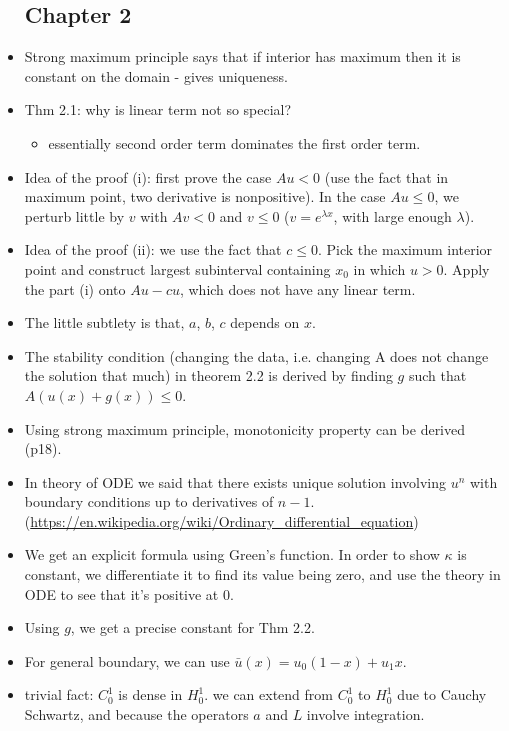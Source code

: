\documentclass{article}
\theoremstyle{remark}
\begin{document}
\begin{itemize}
\subsection*{Chapter 2}
\item Strong maximum principle says that if interior has maximum then it is constant on the domain - gives uniqueness.
\item Thm 2.1: why is linear term not so special?
\begin{itemize}
    \item essentially second order term dominates the first order term. 
\end{itemize}
    \item Idea of the proof (i): first prove the case $Au<0$ (use the fact that in maximum point, two derivative is nonpositive). In the case $Au\leq 0$, we perturb little by $v$ with $Av<0$ and $v\leq 0$ ($v=e^{\lambda x}$, with large enough $\lambda$). 
    \item Idea of the proof (ii): we use the fact that $c\leq 0$. Pick the maximum interior point and construct largest subinterval containing $x_0$ in which $u>0$. Apply the part (i) onto $Au-cu$, which does not have any linear term.
    \item The little subtlety is that, $a$, $b$, $c$ depends on $x$.
    \item The stability condition (changing the data, i.e. changing A does not change the solution that much) in theorem 2.2 is derived by finding $g$ such that $A(u(x)+g(x))\leq 0$.
    \item Using strong maximum principle, monotonicity property can be derived (p18).
    \item In theory of ODE we said that there exists unique solution involving $u^{n}$ with boundary conditions up to derivatives of $n-1$. (\url{https://en.wikipedia.org/wiki/Ordinary_differential_equation})
    \item We get an explicit formula using Green's function. In order to show $\kappa$ is constant, we differentiate it to find its value being zero, and use the theory in ODE to see that it's positive at $0$.
    \item Using $g$, we get a precise constant for Thm 2.2.
    \item For general boundary, we can use $\bar u(x)=u_0 (1-x)+u_1 x$.
    \item trivial fact: $C_0^1$ is dense in $H_0^1$. we can extend from $C_0^1$ to $H_0^1$ due to Cauchy Schwartz, and because the operators $a$ and $L$ involve integration.

\end{itemize}
\end{document}
